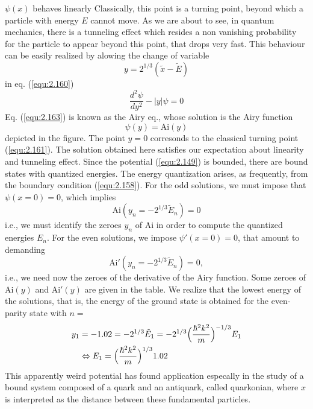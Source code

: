 $\psi(x)$ behaves linearly Classically, this point is a
turning point, beyond which a particle with energy $E$
cannot move. As we are about to see, in quantum mechanics,
there is a tunneling effect which resides a non vanishing
probability for the particle to appear beyond this point,
that drops very fast. This behaviour can be easily realized
by alowing the change of variable
\begin{equation}
  y = 2^{1/3} (\tilde{x}-\tilde{E})
  \label{equ:2.152}
\end{equation}
in eq. (\ref{equ:2.160})
\begin{equation}
  \frac{d^2 \psi}{dy^2} - |y| \psi = 0
  \label{equ:2.163}
\end{equation}
Eq. (\ref{equ:2.163}) is known as the Airy eq., whose
solution is the Airy function
\begin{equation}
  \psi(y) = \text{Ai}(y)
  \label{equ:2.164}
\end{equation}
depicted in the figure. The point $y=0$ corresonds to the
classical turning point (\ref{equ:2.161}). The solution
obtained here satisfies our expectation about linearity and
tunneling effect.
Since the potential (\ref{equ:2.149}) is bounded, there are
bound states with quantized energies. The energy
quantization arises, as frequently, from the boundary
condition (\ref{equ:2.158}).
For the odd solutions, we must impose that $\psi(x=0) = 0$,
which implies
\begin{equation}
  \text{Ai}(y_n = -2^{1/3}\tilde{E}_n) = 0
  \label{equ:2.164}
\end{equation}
i.e., we must identify the zeroes $y_n$ of $\text{Ai}$ in
order to compute the quantized energies $E_n$. For the even
solutions, we impose $\psi'(x=0) = 0$, that amount  to
demanding
\begin{equation}
  \text{Ai}'(y_n = -2^{1/3}\tilde{E}_n) = 0,
  \label{equ:2.165}
\end{equation}
i.e., we need now the zeroes of the derivative of the Airy
function. Some zeroes of $\text{Ai}(y)$ and $\text{Ai}'(y)$
are given in the table.
We realize that the lowest energy of the solutions, that is,
the energy of the ground state is obtained for the
even-parity state with $n =$
\begin{alignat}
  y_1 &= -1.02 = -2^{1/3}\tilde{E}_1 = -2^{1/3}
  \Bigl(\frac{\hbar^2 k^2}{m}\Bigr)^{-1/3}E_1\nonumber\\
  &\Leftrightarrow E_1 = \Bigl(\frac{\hbar^2
k^2}{m}\Bigr)^{1/3} 1.02 \label{equ:2.166}
\end{alignat}
This apparently weird potential has found application
especally in the study of a bound system composed of a quark
and an antiquark, called quarkonian, where $x$ is
interpreted as the distance between these fundamental
particles.
